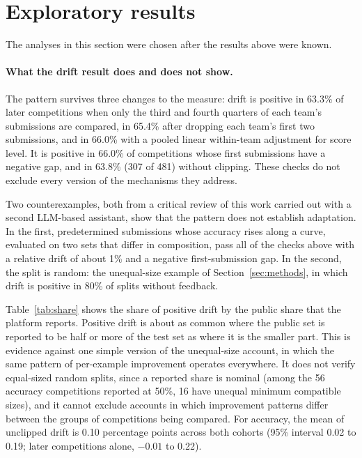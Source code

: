 \documentclass[10pt]{article}
\begin{document}
\section{Exploratory results}
\label{sec:explore}

The analyses in this section were chosen after the results above were known.

\paragraph{What the drift result does and does not show.} The pattern survives three changes to the measure: drift is positive in 63.3\% of later competitions when only the third and fourth quarters of each team's submissions are compared, in 65.4\% after dropping each team's first two submissions, and in 66.0\% with a pooled linear within-team adjustment for score level. It is positive in 66.0\% of competitions whose first submissions have a negative gap, and in 63.8\% (307 of 481) without clipping. These checks do not exclude every version of the mechanisms they address.

Two counterexamples, both from a critical review of this work carried out with a second LLM-based assistant, show that the pattern does not establish adaptation. In the first, predetermined submissions whose accuracy rises along a curve, evaluated on two sets that differ in composition, pass all of the checks above with a relative drift of about 1\% and a negative first-submission gap. In the second, the split is random: the unequal-size example of Section~\ref{sec:methods}, in which drift is positive in 80\% of splits without feedback.

Table~\ref{tab:share} shows the share of positive drift by the public share that the platform reports. Positive drift is about as common where the public set is reported to be half or more of the test set as where it is the smaller part. This is evidence against one simple version of the unequal-size account, in which the same pattern of per-example improvement operates everywhere. It does not verify equal-sized random splits, since a reported share is nominal (among the 56 accuracy competitions reported at 50\%, 16 have unequal minimum compatible sizes), and it cannot exclude accounts in which improvement patterns differ between the groups of competitions being compared. For accuracy, the mean of unclipped drift is 0.10 percentage points across both cohorts (95\% interval 0.02 to 0.19; later competitions alone, $-0.01$ to 0.22).
\end{document}
